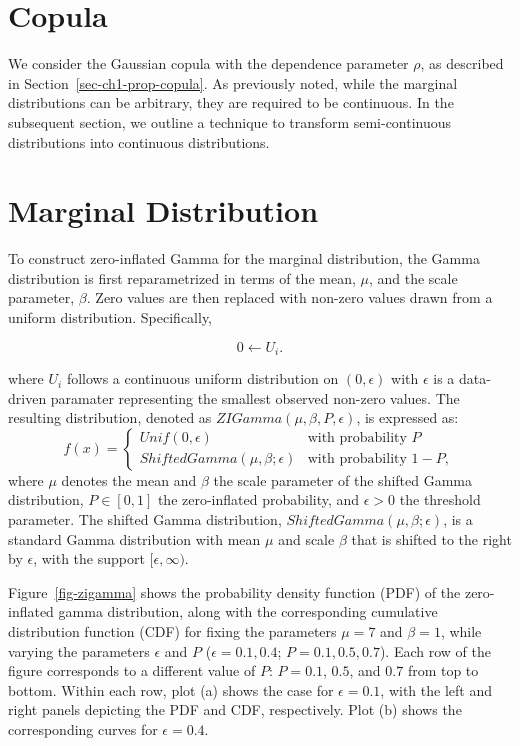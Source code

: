 \documentclass[
  letterpaper,
  double,
  12pt,
  1.0in]{beavtex}
\begin{document}
\section{Copula}\label{copula}

We consider the Gaussian copula with the dependence parameter \(\rho\),
as described in Section~\ref{sec-ch1-prop-copula}. As previously noted,
while the marginal distributions can be arbitrary, they are required to
be continuous. In the subsequent section, we outline a technique to
transform semi-continuous distributions into continuous distributions.

\section{Marginal Distribution}\label{marginal-distribution-1}

To construct zero-inflated Gamma for the marginal distribution, the
Gamma distribution is first reparametrized in terms of the mean,
\(\mu\), and the scale parameter, \(\beta\). Zero values are then
replaced with non-zero values drawn from a uniform distribution.
Specifically,

\begin{equation}
0 \leftarrow U_i.  
\end{equation}

where \(U_i\) follows a continuous uniform distribution on
\((0, \epsilon)\) with \(\epsilon\) is a data-driven paramater
representing the smallest observed non-zero values. The resulting
distribution, denoted as \(ZIGamma(\mu, \beta, P, \epsilon)\), is
expressed as: \begin{equation}
f(x) = 
\begin{cases} 
Unif(0, \epsilon) & \text{with probability } P \\
ShiftedGamma(\mu, \beta; \epsilon) & \text{with probability } 1-P, 
\end{cases}
\end{equation} where \(\mu\) denotes the mean and \(\beta\) the scale
parameter of the shifted Gamma distribution, \(P \in [0, 1]\) the
zero-inflated probability, and \(\epsilon > 0\) the threshold parameter.
The shifted Gamma distribution, \(ShiftedGamma(\mu, \beta; \epsilon)\),
is a standard Gamma distribution with mean \(\mu\) and scale \(\beta\)
that is shifted to the right by \(\epsilon\), with the support
\([\epsilon, \infty)\).

Figure~\ref{fig-zigamma} shows the probability density function (PDF) of
the zero-inflated gamma distribution, along with the corresponding
cumulative distribution function (CDF) for fixing the parameters
\(\mu = 7\) and \(\beta = 1\), while varying the parameters \(\epsilon\)
and \(P\) (\(\epsilon = 0.1, 0.4\); \(P = 0.1, 0.5, 0.7\)). Each row of
the figure corresponds to a different value of \(P\): \(P = 0.1\),
\(0.5\), and \(0.7\) from top to bottom. Within each row, plot (a) shows
the case for \(\epsilon = 0.1\), with the left and right panels
depicting the PDF and CDF, respectively. Plot (b) shows the
corresponding curves for \(\epsilon = 0.4\).
\end{document}
